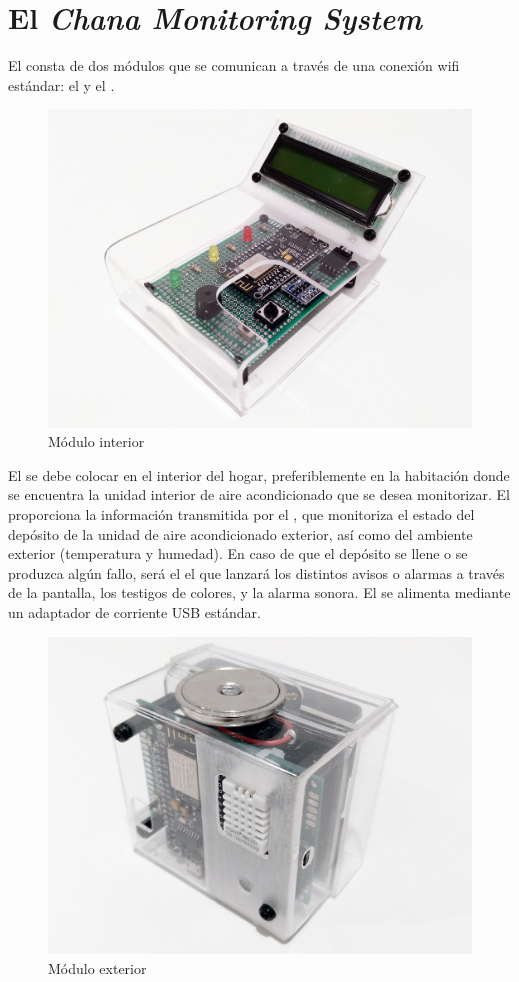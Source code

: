 \section{El \textit{Chana Monitoring System}}
\label{sect:intro}

El \CMS consta de dos módulos que se comunican a través de una conexión wifi estándar: el \MIE y el \MEE.

\begingroup

\setlength{\columnsep}{6pt}
\setlength{\intextsep}{6pt}

\begin{figure}
  \centering
  \includegraphics[width=0.5\columnwidth]{../photos/interior.jpg}
  \caption{Módulo interior}
  \label{fig:interior}
\end{figure}

El \MIE se debe colocar en el interior del hogar, preferiblemente en la habitación donde se encuentra la unidad interior de aire acondicionado que se desea monitorizar.
El \MI proporciona la información transmitida por el \ME, que monitoriza el estado del depósito de la unidad de aire acondicionado exterior, así como del ambiente exterior (temperatura y humedad).
En caso de que el depósito se llene o se produzca algún fallo, será el \MI el que lanzará los distintos avisos o alarmas a través de la pantalla, los testigos de colores, y la alarma sonora.
El \MI se alimenta mediante un adaptador de corriente USB estándar.

\begin{figure}
  \centering
  \includegraphics[width=0.5\columnwidth]{../photos/exterior.jpg}
  \caption{Módulo exterior}
  \label{fig:exterior}
\end{figure}

